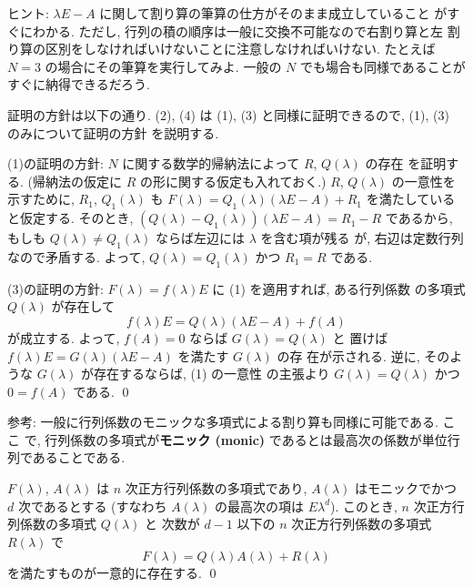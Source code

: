 \documentclass[12pt,twoside]{jarticle}
\begin{document}
\noindent
ヒント: $\lambda E - A$ に関して割り算の筆算の仕方がそのまま成立していること 
がすぐにわかる.  ただし, 行列の積の順序は一般に交換不可能なので右割り算と左
割り算の区別をしなければいけないことに注意しなければいけない.
たとえば $N=3$ の場合にその筆算を実行してみよ.  
一般の $N$ でも場合も同様であることがすぐに納得できるだろう.

証明の方針は以下の通り. 
(2), (4) は (1), (3) と同様に証明できるので, (1), (3) のみについて証明の方針
を説明する.

(1)の証明の方針: $N$ に関する数学的帰納法によって $R$, $Q(\lambda)$ の存在
を証明する.  (帰納法の仮定に $R$ の形に関する仮定も入れておく.)
$R$, $Q(\lambda)$ の一意性を示すために, $R_1$, $Q_1(\lambda)$ 
も $F(\lambda) = Q_1(\lambda)(\lambda E - A) + R_1$ を満たしていると仮定する.  
そのとき, $(Q(\lambda) - Q_1(\lambda))(\lambda E - A) = R_1 - R$ であるから, 
もしも $Q(\lambda) \ne Q_1(\lambda)$ ならば左辺には $\lambda$ を含む項が残る
が, 右辺は定数行列なので矛盾する. 
よって, $Q(\lambda) = Q_1(\lambda)$ かつ $R_1 = R$ である. 

(3)の証明の方針: $F(\lambda)=f(\lambda)E$ に (1) を適用すれば, ある行列係数
の多項式 $Q(\lambda)$ が存在して
\begin{equation*}
  f(\lambda)E = Q(\lambda)(\lambda E - A) + f(A)
\end{equation*}
が成立する.  よって, $f(A)=0$ ならば $G(\lambda)=Q(\lambda)$ と
置けば $f(\lambda)E = G(\lambda)(\lambda E - A)$ を満たす $G(\lambda)$ の存
在が示される.  逆に, そのような $G(\lambda)$ が存在するならば, (1) の一意性
の主張より $G(\lambda)=Q(\lambda)$ かつ $0 = f(A)$ である. 
\qed


\medskip
\noindent
参考: 一般に行列係数のモニックな多項式による割り算も同様に可能である.  ここ
で, 行列係数の多項式が{\bf モニック (monic)} であるとは最高次の係数が単位行
列であることである.

\begin{question}
  $F(\lambda)$, $A(\lambda)$ は $n$ 次正方行列係数の多項式であり, 
  $A(\lambda)$ はモニックでかつ $d$ 次であるとする
  (すなわち $A(\lambda)$ の最高次の項は $E \lambda^d$). 
  このとき, $n$ 次正方行列係数の多項式 $Q(\lambda)$ と
  次数が $d-1$ 以下の $n$ 次正方行列係数の多項式 $R(\lambda)$ で
  \begin{equation*}
    F(\lambda) = Q(\lambda)A(\lambda) + R(\lambda)
  \end{equation*}
  を満たすものが一意的に存在する. \qed
\end{question}
\end{document}
